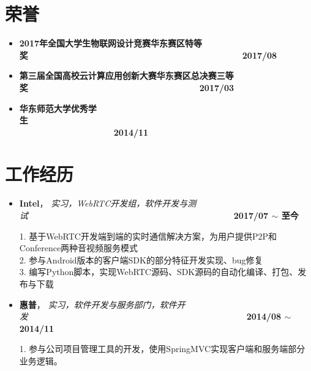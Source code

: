 \documentclass[letterpaper, UTF8, 11pt]{article}
\begin{document}
	\section*{\textbf{荣誉}}\vspace{-0.15in}
	\begin{itemize}
		\item \textbf{2017年全国大学生物联网设计竞赛华东赛区特等奖}~~~~~~~~~~~~~~~~~~~~~~~~~~~~~~~~~~~~~~~~~~~~~~~~~~\textbf{2017/08}
		\item \textbf{第三届全国高校云计算应用创新大赛华东赛区总决赛三等奖}~~~~~~~~~~~~~~~~~~~~~~~~~~~~~~~~~~~~~~~~\textbf{2017/03}
		\item \textbf{华东师范大学优秀学生}~~~~~~~~~~~~~~~~~~~~~~~~~~~~~~~~~~~~~~~~~~~~~~~~~~~~~~~~~~~~~~~~~~~~~~~~~~~~~~~~~~~~~~~~\textbf{2014/11}
	\end{itemize}
	\vspace{-0.32in}
	
	\section*{\textbf{工作经历}}\vspace{-0.15in}
	\begin{itemize}
		\item \textbf{Intel}， \emph{实习，WebRTC开发组，软件开发与测试}~~~~~~~~~~~~~~~~~~~~~~~~~~~~~~~~~~~~~~~~~~~~~~~~\textbf{2017/07 $\sim$ 至今}
		
		1. 基于WebRTC开发端到端的实时通信解决方案，为用户提供P2P和Conference两种音视频服务模式\\
		2. 参与Android版本的客户端SDK的部分特征开发实现、bug修复\\
		3. 编写Python脚本，实现WebRTC源码、SDK源码的自动化编译、打包、发布与下载
		\item \textbf{惠普}， \emph{实习，软件开发与服务部门，软件开发}~~~~~~~~~~~~~~~~~~~~~~~~~~~~~~~~~~~~~~~~~~~~~~~~~~~\textbf{2014/08 $\sim$ 2014/11}
		
		1. 参与公司项目管理工具的开发，使用SpringMVC实现客户端和服务端部分业务逻辑。
	\end{itemize}
	\vspace{-0.32in}
	
\end{document}
